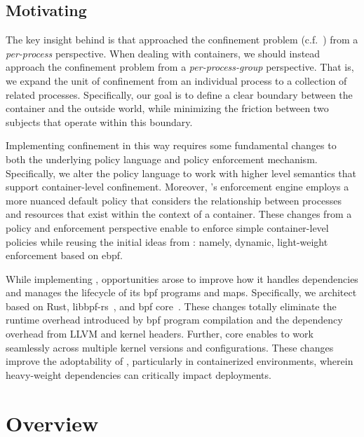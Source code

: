\subsection{Motivating \bpfcontain{}}

The key insight behind \bpfcontain{} is that \bpfbox{} approached the confinement problem
(c.f.~) from a \textit{per-process} perspective. When dealing
with containers, we should instead approach the confinement problem from
a \textit{per-process-group} perspective. That is, we expand the unit of confinement from
an individual process to a collection of related processes. Specifically, our goal is to
define a clear boundary between the container and the outside world, while minimizing the
friction between two subjects that operate within this boundary.

Implementing confinement in this way requires some fundamental changes to both the
underlying policy language and policy enforcement mechanism. Specifically, we alter the
policy language to work with higher level semantics that support container-level
confinement. Moreover, \bpfcontain{}'s enforcement engine employs a more nuanced default
policy that considers the relationship between processes and resources that exist within
the context of a container. These changes from a policy and enforcement perspective enable
\bpfcontain{} to enforce simple container-level policies while reusing the initial ideas
from \bpfbox{}: namely, dynamic, light-weight enforcement based on \gls{ebpf}.

While implementing \bpfcontain{}, opportunities arose to improve how it handles
dependencies and manages the lifecycle of its \gls{bpf} programs and maps. Specifically,
we architect \bpfcontain{} based on Rust, libbpf-rs~\cite{libbpf-rs}, and \gls{bpf}
\gls{core}~\cite{nakryiko2020_core}. These changes totally eliminate the runtime overhead
introduced by \gls{bpf} program compilation and the dependency overhead from LLVM and
kernel headers. Further, \gls{core} enables \bpfcontain{} to work seamlessly across
multiple kernel versions and configurations. These changes improve the adoptability of
\bpfcontain{}, particularly in containerized environments, wherein heavy-weight
dependencies can critically impact deployments.


\section{\bpfcontain{} Overview}%
\label{s:bpfcontain-overview}

